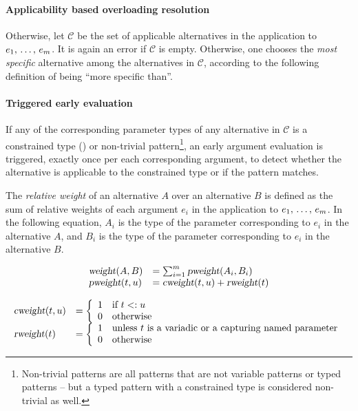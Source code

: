 \paragraph{Applicability based overloading resolution}
Otherwise, let $\mathcal{C}$ be the set of applicable alternatives in the application to $e_1 ,\, \ldots ,\, e_m$. It is again an error if $\mathcal{C}$ is empty. Otherwise, one chooses the {\em most specific} alternative among the alternatives in $\mathcal{C}$, according to the following definition of being  ``more specific than''.

\paragraph{Triggered early evaluation}
If any of the corresponding parameter types of any alternative in $\mathcal{C}$ is a constrained type () or non-trivial pattern\footnote{Non-trivial patterns are all patterns that are not variable patterns or typed patterns -- but a typed pattern with a constrained type is considered non-trivial as well.}, an early argument evaluation is triggered, exactly once per each corresponding argument, to detect whether the alternative is applicable to the constrained type or if the pattern matches. 

\begin{definition}
The {\em relative weight} of an alternative $A$ over an alternative $B$ is defined as the sum of relative weights of each argument $e_i$ in the application to $e_1 ,\, \ldots ,\, e_m$. In the following equation, $A_i$ is the type of the parameter corresponding to $e_i$ in the alternative $A$, and $B_i$ is the type of the parameter corresponding to $e_i$ in the alternative $B$. 

\[\begin{array}{l l}
\mbox{\sl weight}(A, B) &= \sum_{i=1}^{m} \mbox{\sl pweight}(A_i, B_i) \\
\mbox{\sl pweight}(t, u) &= \mbox{\sl cweight}(t, u) + \mbox{\sl rweight}(t)
\end{array}
\]

\[\begin{array}{l l}
\mbox{\sl cweight}(t, u) &= \left\{ 
  \begin{array}{l l}
    1 & \textrm{if $t <: u$}\\
    0 & \textrm{otherwise}
  \end{array} \right. \\
\mbox{\sl rweight}(t) &= \left\{ 
  \begin{array}{l l}
    1 & \textrm{unless $t$ is a variadic or a capturing named parameter}\\
    0 & \textrm{otherwise}
  \end{array} \right.
\end{array}\]
\end{definition}

